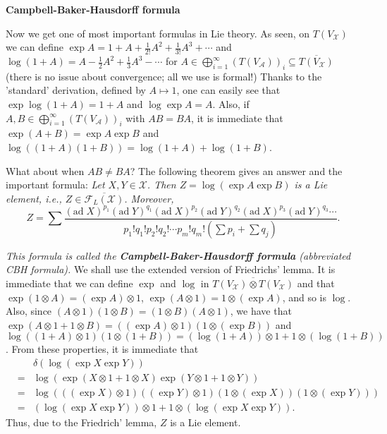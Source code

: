 \documentclass{article}
\newcommand{\ad}[1]{\mathrm{ad}\; #1}
\begin{document}
\newpage

\textbf{Campbell-Baker-Hausdorff formula}

Now we get one of most important formulas in Lie theory.
As seen, on $T(V_\mathcal{X})$ we can define $\exp{A} = 1 + A + \frac{1}{2!} A^2 + \frac{1}{3!} A^3 + \cdots$ and $\log{(1 +A)} = A - \frac{1}{2} A^2 + \frac{1}{3} A^3 - \cdots$ for $A \in \bigoplus_{i = 1}^\infty (T(V_\mathcal{A}))_i \subseteq \overline{T(V_\mathcal{X})}$ (there is no issue about convergence; all we use is formal!)
Thanks to the 'standard' derivation, defined by $A \mapsto 1$, one can easily see that $\exp{\log{(1 + A)}} = 1 + A$ and $\log{\exp{A}} = A$.
Also, if $A, B \in \bigoplus_{i = 1}^\infty (T(V_\mathcal{A}))_i$ with $AB = BA$, it is immediate that $\exp{(A + B)} = \exp{A} \exp{B}$ and $\log{((1 + A)(1 + B))} = \log{(1 + A)} + \log{(1 + B)}$.

What about when $AB \ne BA$?
The following theorem gives an answer and the important formula: \textit{Let $X, Y \in \mathcal{X}$.
Then $Z = \log{(\exp{A} \exp{B})}$ is a Lie element, i.e., $Z \in \overline{\mathcal{F}_L(\mathcal{X})}$.
Moreover, }
\begin{displaymath}
  Z = \sum \frac{(\ad{X})^{p_1} (\ad{Y})^{q_1} (\ad{X})^{p_2} (\ad{Y})^{q_2} (\ad{X})^{p_3} (\ad{Y})^{q_3} \cdots}{p_1! q_1! p_2! q_2! \cdots p_m! q_m! (\sum p_i + \sum q_j)}.
\end{displaymath}

\textit{This formula is called the \textbf{Campbell-Baker-Hausdorff formula} (abbreviated CBH formula).}
We shall use the extended version of Friedrichs' lemma.
It is immediate that we can define $\exp$ and $\log$ in $\overline{T(V_\mathcal{X}) \otimes T(V_\mathcal{X})}$ and that $\exp{(1 \otimes A)} = (\exp{A}) \otimes 1$, $\exp{(A \otimes 1)} = 1 \otimes (\exp{A})$, and so is $\log$.
Also, since $(A \otimes 1)(1 \otimes B) = (1 \otimes B)(A \otimes 1)$, we have that $\exp{(A \otimes 1 + 1 \otimes B)} = ((\exp{A}) \otimes 1)(1 \otimes (\exp{B}))$ and $\log{((1 + A) \otimes 1)(1 \otimes (1 + B))} = (\log{(1 + A)}) \otimes 1 + 1 \otimes (\log{(1 + B)})$.
From these properties, it is immediate that
\begin{eqnarray*}
  & & \delta(\log{(\exp{X} \exp{Y})}) \\
  &=& \log{(\exp{(X \otimes 1 + 1 \otimes X)} \exp{(Y \otimes 1 + 1 \otimes Y)})} \\
  &=& \log{(((\exp{X}) \otimes 1) ((\exp{Y}) \otimes 1) (1 \otimes (\exp{X})) (1 \otimes (\exp{Y})))} \\
  &=& (\log{(\exp{X} \exp{Y})}) \otimes 1 + 1 \otimes (\log{(\exp{X} \exp{Y})}).
\end{eqnarray*}
Thus, due to the Friedrich' lemma, $Z$ is a Lie element.
\end{document}
